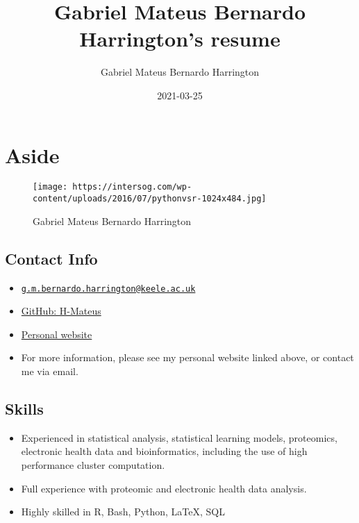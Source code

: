 \documentclass[
]{article}
\title{Gabriel Mateus Bernardo Harrington's resume}
\author{Gabriel Mateus Bernardo Harrington}
\date{2021-03-25}
\providecommand{\tightlist}{%
  \setlength{\itemsep}{0pt}\setlength{\parskip}{0pt}}
\begin{document}
\maketitle

\hypertarget{aside}{%
\section{Aside}\label{aside}}

\begin{figure}
\centering
\texttt{[image: https://intersog.com/wp-content/uploads/2016/07/pythonvsr-1024x484.jpg]}
\caption{Gabriel Mateus Bernardo Harrington}
\end{figure}

\hypertarget{contact}{%
\subsection{Contact Info}\label{contact}}

\begin{itemize}
\tightlist
\item

  \href{mailto:g.m.bernardo.harrington@keele.ac.uk}{\nolinkurl{g.m.bernardo.harrington@keele.ac.uk}}
\item
  \href{https://github.com/H-Mateus}{GitHub: H-Mateus}
\item
  \href{https://gmbernardoharrington.netlify.app/}{Personal website}
\item
  For more information, please see my personal website linked above, or
  contact me via email.
\end{itemize}

\hypertarget{skills}{%
\subsection{Skills}\label{skills}}

\begin{itemize}
\item
  Experienced in statistical analysis, statistical learning models,
  proteomics, electronic health data and bioinformatics, including the
  use of high performance cluster computation.
\item
  Full experience with proteomic and electronic health data analysis.
\item
  Highly skilled in R, Bash, Python, LaTeX, SQL
\end{itemize}
\end{document}
